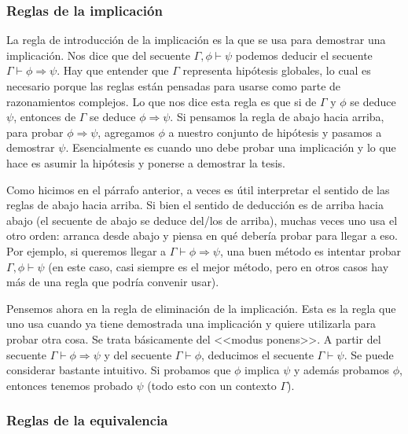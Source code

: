 \documentclass[a4paper, 12pt]{report}
\newcommand{\Ra}{\Rightarrow}
\theoremstyle{definition}
\begin{document}
\subsubsection{Reglas de la implicación}

La regla de introducción de la implicación es la que se usa para demostrar una implicación. Nos dice que del secuente $\Gamma,\phi\vdash\psi$ podemos deducir el secuente $\Gamma\vdash\phi\Ra\psi$. Hay que entender que $\Gamma$ representa hipótesis globales, lo cual es necesario porque las reglas están pensadas para usarse como parte de razonamientos complejos. Lo que nos dice esta regla es que si de $\Gamma$ y $\phi$ se deduce $\psi$, entonces de $\Gamma$ se deduce $\phi\Ra\psi$. Si pensamos la regla de abajo hacia arriba, para probar $\phi\Ra\psi$, agregamos $\phi$ a nuestro conjunto de hipótesis y pasamos a demostrar $\psi$. Esencialmente es cuando uno debe probar una implicación y lo que hace es asumir la hipótesis y ponerse a demostrar la tesis.

Como hicimos en el párrafo anterior, a veces es útil interpretar el sentido de las reglas de abajo hacia arriba. Si bien el sentido de deducción es de arriba hacia abajo (el secuente de abajo se deduce del/los de arriba), muchas veces uno usa el otro orden: arranca desde abajo y piensa en qué debería probar para llegar a eso. Por ejemplo, si queremos llegar a $\Gamma\vdash\phi\Ra\psi$, una buen método es intentar probar $\Gamma,\phi\vdash\psi$ (en este caso, casi siempre es el mejor método, pero en otros casos hay más de una regla que podría convenir usar).

Pensemos ahora en la regla de eliminación de la implicación. Esta es la regla que uno usa cuando ya tiene demostrada una implicación y quiere utilizarla para probar otra cosa. Se trata básicamente del <<modus ponens>>. A partir del secuente $\Gamma\vdash\phi\Ra\psi$ y del secuente $\Gamma\vdash\phi$, deducimos el secuente $\Gamma\vdash\psi$. Se puede considerar bastante intuitivo. Si probamos que $\phi$ implica $\psi$ y además probamos $\phi$, entonces tenemos probado $\psi$ (todo esto con un contexto $\Gamma$).

\subsubsection{Reglas de la equivalencia}
\end{document}
